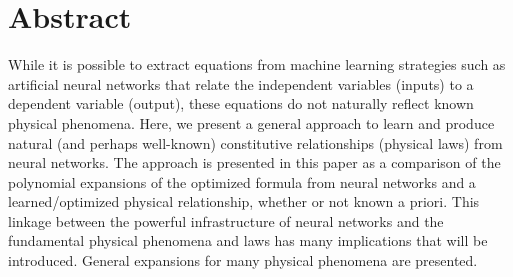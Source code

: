 \section{Abstract}\label{Abstract}

While it is possible to extract equations from machine learning strategies such as artificial neural networks that relate the independent variables (inputs) to a dependent variable (output), these equations do not naturally reflect known physical phenomena. Here, we present a general approach to learn and produce natural (and perhaps well-known) constitutive relationships (physical laws) from neural networks. The approach is presented in this paper as a comparison of the polynomial expansions of the optimized formula from neural networks and a learned/optimized physical relationship, whether or not known a priori. This linkage between the powerful infrastructure of neural networks and the fundamental physical phenomena and laws has many implications that will be introduced. General expansions for many physical phenomena are presented.

